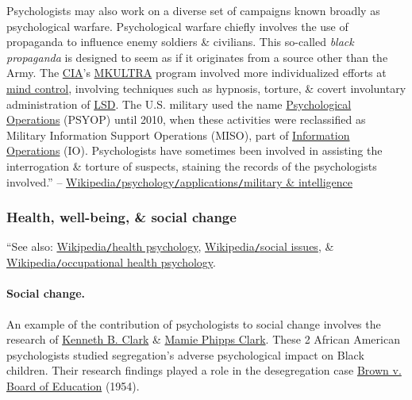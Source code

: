 \documentclass[oneside]{book}
\numberwithin{equation}{section}
\begin{document}
Psychologists may also work on a diverse set of campaigns known broadly as psychological warfare. Psychological warfare chiefly involves the use of propaganda to influence enemy soldiers \& civilians. This so-called \textit{black propaganda} is designed to seem as if it originates from a source other than the Army. The \href{https://en.wikipedia.org/wiki/CIA}{CIA}'s \href{https://en.wikipedia.org/wiki/MKULTRA}{MKULTRA} program involved more individualized efforts at \href{https://en.wikipedia.org/wiki/Mind_control}{mind control}, involving techniques such as hypnosis, torture, \& covert involuntary administration of \href{https://en.wikipedia.org/wiki/LSD}{LSD}. The U.S. military used the name \href{https://en.wikipedia.org/wiki/Psychological_Operations_(United_States)}{Psychological Operations} (PSYOP) until 2010, when these activities were reclassified as Military Information Support Operations (MISO), part of \href{https://en.wikipedia.org/wiki/Information_Operations_(United_States)}{Information Operations} (IO). Psychologists have sometimes been involved in assisting the interrogation \& torture of suspects, staining the records of the psychologists involved.'' -- \href{https://en.wikipedia.org/wiki/Psychology#Military_and_intelligence}{Wikipedia\texttt{/}psychology\texttt{/}applications\texttt{/}military \& intelligence}

\subsubsection{Health, well-being, \& social change}
``See also: \href{https://en.wikipedia.org/wiki/Health_psychology}{Wikipedia\texttt{/}health psychology}, \href{https://en.wikipedia.org/wiki/Social_issues}{Wikipedia\texttt{/}social issues}, \& \href{https://en.wikipedia.org/wiki/Occupational_health_psychology}{Wikipedia\texttt{/}occupational health psychology}.

\paragraph{Social change.}
An example of the contribution of psychologists to social change involves the research of \href{https://en.wikipedia.org/wiki/Kenneth_B._Clark}{Kenneth B. Clark} \& \href{https://en.wikipedia.org/wiki/Mamie_Phipps_Clark}{Mamie Phipps Clark}. These 2 African American psychologists studied segregation's adverse psychological impact on Black children. Their research findings played a role in the desegregation case \href{https://en.wikipedia.org/wiki/Brown_v._Board_of_Education}{Brown v. Board of Education} (1954).
\end{document}
